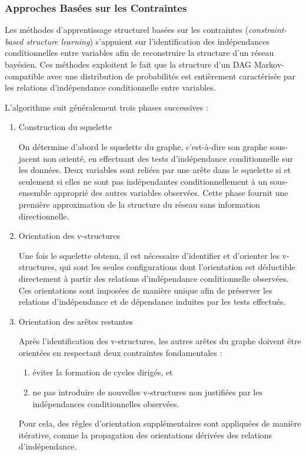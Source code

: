 \documentclass{article}
\begin{document}
\subsubsection{Approches Basées sur les Contraintes}


Les méthodes d'apprentissage structurel basées sur les contraintes (\textit{constraint-based structure learning})
s'appuient sur l'identification des indépendances conditionnelles entre variables afin de reconstruire la
structure d'un réseau bayésien. Ces méthodes exploitent le fait que la structure d'un DAG Markov-compatible avec
une distribution de probabilités est entièrement caractérisée par les relations d'indépendance conditionnelle
entre variables.

L'algorithme suit généralement trois phases successives :

\begin{enumerate}
    \item Construction du squelette

          On détermine d'abord le squelette du graphe, c'est-à-dire son graphe sous-jacent non orienté,
          en effectuant des tests d'indépendance conditionnelle sur les données. Deux variables sont
          reliées par une arête dans le squelette si et seulement si elles ne sont pas indépendantes
          conditionnellement à un sous-ensemble approprié des autres variables observées. Cette phase
          fournit une première approximation de la structure du réseau sans information directionnelle.

    \item Orientation des v-structures

          Une fois le squelette obtenu, il est nécessaire d'identifier et d'orienter les v-structures,
          qui sont les seules configurations dont l'orientation est déductible directement à partir des
          relations d'indépendance conditionnelle observées. Ces orientations sont imposées de manière
          unique afin de préserver les relations d'indépendance et de dépendance induites par les tests effectués.

    \item Orientation des arêtes restantes

          Après l'identification des v-structures, les autres arêtes du graphe doivent être orientées en
          respectant deux contraintes fondamentales :
          \begin{enumerate}[label=(\roman*)]
              \item éviter la formation de cycles dirigés, et
              \item ne pas introduire de nouvelles v-structures non justifiées par les indépendances
                    conditionnelles observées.
          \end{enumerate}


          Pour cela, des règles d'orientation supplémentaires sont appliquées de manière itérative, comme la
          propagation des orientations dérivées des relations d'indépendance.
\end{enumerate}
\end{document}
